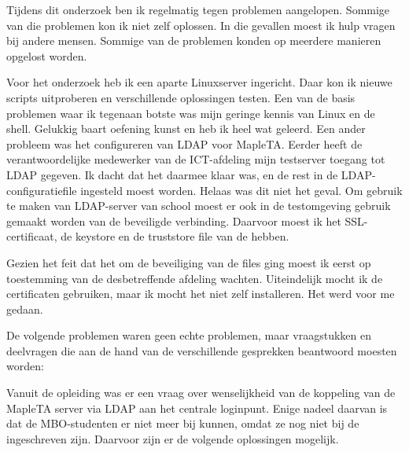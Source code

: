 
Tijdens dit onderzoek ben ik regelmatig tegen problemen
aangelopen. Sommige van die problemen kon ik niet zelf oplossen. In
die gevallen moest ik hulp vragen bij andere mensen. Sommige van de
problemen konden op meerdere manieren opgelost worden.


Voor het onderzoek heb ik een aparte Linuxserver ingericht. Daar kon
ik nieuwe scripts uitproberen en verschillende oplossingen testen. Een
van de basis problemen waar ik tegenaan botste was mijn geringe kennis
van Linux en de shell. Gelukkig baart oefening kunst en heb ik heel
wat geleerd. Een ander probleem was het configureren van LDAP voor
MapleTA. Eerder heeft de verantwoordelijke medewerker van de
ICT-afdeling mijn testserver toegang tot LDAP gegeven. Ik dacht dat
het daarmee klaar was, en de rest in de LDAP-configuratiefile
ingesteld moest worden. Helaas was dit niet het geval. Om gebruik te
maken van LDAP-server van school moest er ook in de testomgeving
gebruik gemaakt worden van de beveiligde verbinding. Daarvoor moest ik
het SSL-certificaat, de keystore en de truststore file van de \HR{}
hebben.

Gezien het feit dat het om de beveiliging van de \HR{} files ging moest
ik eerst op toestemming van de desbetreffende afdeling
wachten. Uiteindelijk mocht ik de certificaten gebruiken, maar ik
mocht het niet zelf installeren. Het werd voor me gedaan.

\label{sec:MBO} 

De volgende problemen waren geen echte problemen, maar vraagstukken en
deelvragen die aan de hand van de verschillende gesprekken beantwoord
moesten worden:

Vanuit de opleiding was er een vraag over wenselijkheid van de
koppeling van de MapleTA server via LDAP aan het centrale
loginpunt. Enige nadeel daarvan is dat de MBO-studenten er niet meer
bij kunnen, omdat ze nog niet bij de \HR{} ingeschreven zijn. Daarvoor
zijn er de volgende oplossingen mogelijk.

